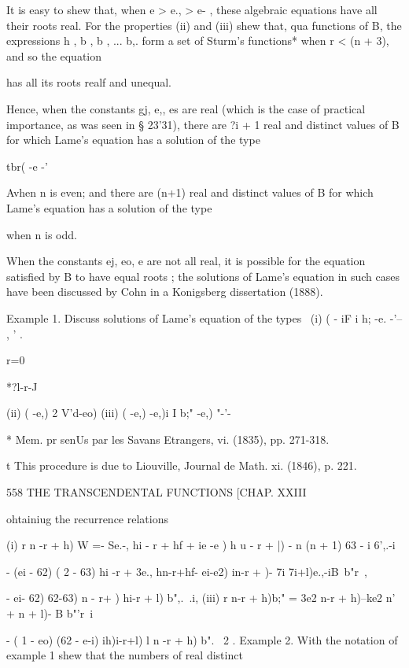 {{{{It is easy to shew that, when e > e., > e- , these algebraic equations
have all their roots real. For the properties (ii) and (iii) shew
that, qua functions of B, the expressions h , b , b , ... b,. form a
set of Sturm's functions* when r < (n + 3), and so the equation

has all its roots realf and unequal.

Hence, when the constants gj, e,, es are real (which is the case of
practical importance, as was seen in § 23'31), there are ?i + 1 real
and distinct values of B for which Lame's equation has a solution of
the type

tbr( -e -'

Avhen n is even; and there are (n+1) real and distinct values of B for
which Lame's equation has a solution of the type

when n is odd.

When the constants ej, eo, e are not all real, it is possible for the
equation satisfied by B to have equal roots ; the solutions of Lame's
equation in such cases have been discussed by Cohn in a Konigsberg
dissertation (1888).

Example 1. Discuss solutions of Lame's equation of the types \ (i) ( -
iF i h; -e. -'-- , ' .

r=0



*?l-r-J



(ii) ( -e,) 2 V'd-eo) (iii) ( -e,) -e,)i I b;" -e,) "-'-\



* Mem. pr senUs par les Savans Etrangers, vi. (1835), pp. 271-318.

t This procedure is due to Liouville, Journal de Math. xi. (1846), p.
221.



558 THE TRANSCENDENTAL FUNCTIONS [CHAP. XXIII

ohtainiug the recurrence relations

(i) r n -r + h) W =- Se.-, hi - r + hf + ie -e ) h u - r + |) - n (n +
1) 63 - i 6',.-i

- (ei - 62) ( 2 - 63) hi -r + %
3e., hn-r+hf- ei-e2) in-r + )- 7i 7i+l)e.,-iB\ b"r\ ,

- ei- 62) 62-63) n - r+ ) hi-r + l) b",.\ .i, (iii) r n-r + h)b;" =
3e2 n-r + h)--ke2 n' + n + l)- B b"'r\ i

- ( 1 - eo) (62 - e-i) ih)i-r+l) l n -r + h) b". \ 2 . Example 2. With
the notation of example 1 shew that the numbers of real distinct

}}}}
